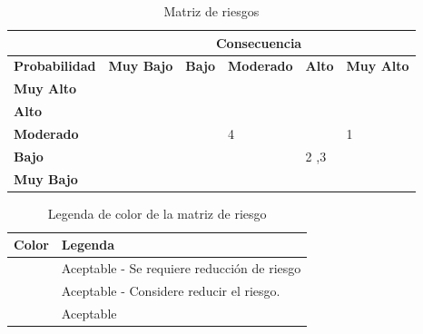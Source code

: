 \documentclass{article}
\begin{document}

\begin{table}[H]
\centering
\caption{Matriz de riesgos}
\begin{tabular}{|l|l|l|l|l|l|}
\hline
                      & \multicolumn{5}{c|}{\textbf{Consecuencia}}                                                                                                                  \\ \hline
\textbf{Probabilidad} & \textbf{Muy Bajo}        & \textbf{Bajo}            & \textbf{Moderado}        & \textbf{Alto}            & \textbf{Muy Alto}                               \\ \hline
\textbf{Muy Alto}     & \cellcolor{yellow! 50}& \cellcolor{yellow! 50}& \cellcolor{yellow! 50}& \cellcolor{red! 50}  & \cellcolor{red! 50}  \\ \hline
\textbf{Alto}         & \cellcolor{yellow! 50}& \cellcolor{yellow! 50}& \cellcolor{yellow! 50}& \cellcolor{red! 50}  & \cellcolor{red! 50}  \\ \hline
\textbf{Moderado}     & \cellcolor{green! 50}  & \cellcolor{yellow! 50}& \cellcolor{yellow! 50}4 & \cellcolor{yellow! 50}& \cellcolor{red! 50}  1 \\ \hline
\textbf{Bajo}         & \cellcolor{green! 50}  & \cellcolor{green! 50}  & \cellcolor{yellow! 50}  & \cellcolor{yellow! 50} 2 ,3 & \cellcolor{red! 50}  \\ \hline
\textbf{Muy Bajo}     & \cellcolor{green! 50}  & \cellcolor{green! 50}  & \cellcolor{yellow! 50}& \cellcolor{yellow! 50}& \cellcolor{yellow! 50}\\ \hline
\end{tabular}
\end{table}



\begin{table}[H]
\centering
\caption{Legenda de color de la matriz de riesgo}
\begin{tabular}{|p{2cm}|p{10cm}|}
\hline \bf Color & \bf Legenda \\
\hline \cellcolor{red! 50} & Aceptable - Se requiere reducción de riesgo\\ [10pt]
\hline \cellcolor{yellow! 50} & Aceptable - Considere reducir el riesgo. \\[10pt]
\hline \cellcolor{green! 50} & Aceptable \\ [10pt]
\hline
\end{tabular}
\end{table}
\end{document}
